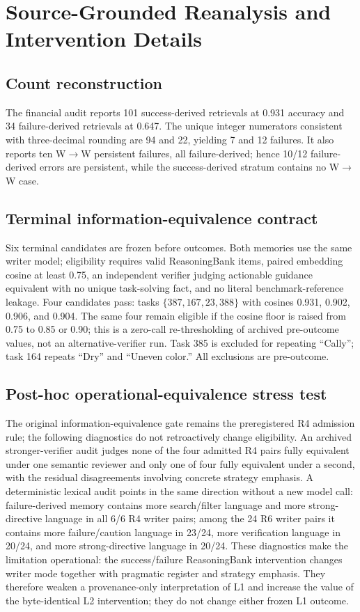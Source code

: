 \section{Source-Grounded Reanalysis and Intervention Details}
\subsection{Count reconstruction}
The financial audit reports 101 success-derived retrievals at 0.931 accuracy and 34 failure-derived retrievals at 0.647. The unique integer numerators consistent with three-decimal rounding are 94 and 22, yielding 7 and 12 failures. It also reports ten W$\rightarrow$W persistent failures, all failure-derived; hence 10/12 failure-derived errors are persistent, while the success-derived stratum contains no W$\rightarrow$W case.

\subsection{Terminal information-equivalence contract}
Six terminal candidates are frozen before outcomes. Both memories use the same writer model; eligibility requires valid ReasoningBank items, paired embedding cosine at least 0.75, an independent verifier judging actionable guidance equivalent with no unique task-solving fact, and no literal benchmark-reference leakage. Four candidates pass: tasks $\{387,167,23,388\}$ with cosines 0.931, 0.902, 0.906, and 0.904. The same four remain eligible if the cosine floor is raised from 0.75 to 0.85 or 0.90; this is a zero-call re-thresholding of archived pre-outcome values, not an alternative-verifier run. Task 385 is excluded for repeating ``Cally''; task 164 repeats ``Dry'' and ``Uneven color.'' All exclusions are pre-outcome.

\subsection{Post-hoc operational-equivalence stress test}
The original information-equivalence gate remains the preregistered R4 admission rule; the following diagnostics do not retroactively change eligibility. An archived stronger-verifier audit judges none of the four admitted R4 pairs fully equivalent under one semantic reviewer and only one of four fully equivalent under a second, with the residual disagreements involving concrete strategy emphasis. A deterministic lexical audit points in the same direction without a new model call: failure-derived memory contains more search/filter language and more strong-directive language in all 6/6 R4 writer pairs; among the 24 R6 writer pairs it contains more failure/caution language in 23/24, more verification language in 20/24, and more strong-directive language in 20/24. These diagnostics make the limitation operational: the success/failure ReasoningBank intervention changes writer mode together with pragmatic register and strategy emphasis. They therefore weaken a provenance-only interpretation of L1 and increase the value of the byte-identical L2 intervention; they do not change either frozen L1 outcome.

